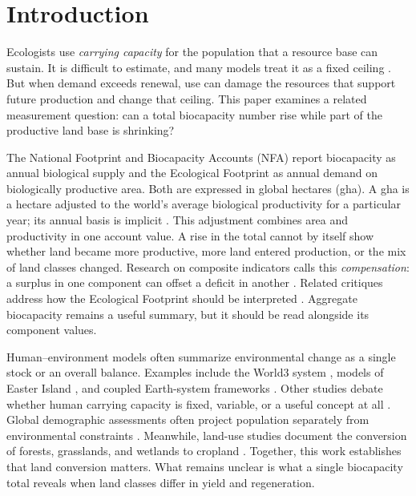 \documentclass[preprint,12pt,authoryear]{elsarticle}
\begin{document}
\section{Introduction}\label{sec:intro}

Ecologists use \emph{carrying capacity} for the population that a resource base can sustain. It is difficult to estimate, and many models treat it as a fixed ceiling \citep{Cohen1995}. But when demand exceeds renewal, use can damage the resources that support future production and change that ceiling. This paper examines a related measurement question: can a total biocapacity number rise while part of the productive land base is shrinking?

The National Footprint and Biocapacity Accounts (NFA) report biocapacity as annual biological supply and the Ecological Footprint as annual demand on biologically productive area. Both are expressed in global hectares (gha). A gha is a hectare adjusted to the world's average biological productivity for a particular year; its annual basis is implicit \citep{GFNStandards2009,GFNGuidebook2019}. This adjustment combines area and productivity in one account value. A rise in the total cannot by itself show whether land became more productive, more land entered production, or the mix of land classes changed. Research on composite indicators calls this \emph{compensation}: a surplus in one component can offset a deficit in another \citep{Nardo2008,Becker2017,Fischer2022}. Related critiques address how the Ecological Footprint should be interpreted \citep{Blomqvist2013,GiampietroSaltelli2014,vdBerghGrazi2015,Galli2016}. Aggregate biocapacity remains a useful summary, but it should be read alongside its component values.

Human--environment models often summarize environmental change as a single stock or an overall balance. Examples include the World3 system \citep{Meadows1972,Meadows1974,Meadows2004}, models of Easter Island \citep{BranderTaylor1998,Anderies2000}, and coupled Earth-system frameworks \citep{Motesharrei2016,Donges2017,CalvinBondLamberty2018,HendersonLoreau2018}. Other studies debate whether human carrying capacity is fixed, variable, or a useful concept at all \citep{Cohen1995,vdBerghRietveld2004,Simon1996,Meyer1994,MeyerAusubel1999,Dasgupta2021}. Global demographic assessments often project population separately from environmental constraints \citep{UN2022}. Meanwhile, land-use studies document the conversion of forests, grasslands, and wetlands to cropland \citep{Haberl2007,Krausmann2013,Erb2017}. Together, this work establishes that land conversion matters. What remains unclear is what a single biocapacity total reveals when land classes differ in yield and regeneration.
\end{document}
